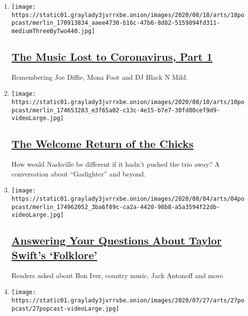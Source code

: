 \begin{enumerate}
\def\labelenumi{\arabic{enumi}.}
\item
  \texttt{[image: https://static01.graylady3jvrrxbe.onion/images/2020/08/18/arts/18popcast/merlin\_170913834\_aaee4730-b16c-47b6-8d82-5159894fd311-mediumThreeByTwo440.jpg]}

  \hypertarget{the-music-lost-to-coronavirus-part-1}{%
  \subsection{\texorpdfstring{\href{/2020/08/18/arts/music/popcast-coronavirus-deaths.html}{The
  Music Lost to Coronavirus, Part
  1}}{The Music Lost to Coronavirus, Part 1}}\label{the-music-lost-to-coronavirus-part-1}}

  Remembering Joe Diffie, Mona Foot and DJ Black N Mild.
\item
  \texttt{[image: https://static01.graylady3jvrrxbe.onion/images/2020/08/10/arts/10popcast/merlin\_174653283\_e3f65a02-c13c-4e15-b7e7-30fd80cef9d9-videoLarge.jpg]}

  \hypertarget{the-welcome-return-of-the-chicks}{%
  \subsection{\texorpdfstring{\href{/2020/08/10/arts/music/popcast-the-chicks-gaslighter.html}{The
  Welcome Return of the
  Chicks}}{The Welcome Return of the Chicks}}\label{the-welcome-return-of-the-chicks}}

  How would Nashville be different if it hadn't pushed the trio away? A
  conversation about ``Gaslighter'' and beyond.
\item
  \texttt{[image: https://static01.graylady3jvrrxbe.onion/images/2020/08/04/arts/04popcast/merlin\_174962052\_3ba6f89c-ca2a-4420-98b8-a5a3594f22db-videoLarge.jpg]}

  \hypertarget{answering-your-questions-about-taylor-swifts-folklore}{%
  \subsection{\texorpdfstring{\href{/2020/08/04/arts/music/taylor-swift-folklore-questions.html}{Answering
  Your Questions About Taylor Swift's
  `Folklore'}}{Answering Your Questions About Taylor Swift's `Folklore'}}\label{answering-your-questions-about-taylor-swifts-folklore}}

  Readers asked about Bon Iver, country music, Jack Antonoff and more.
\item
  \texttt{[image: https://static01.graylady3jvrrxbe.onion/images/2020/07/27/arts/27popcast/27popcast-videoLarge.jpg]}


\end{enumerate}
